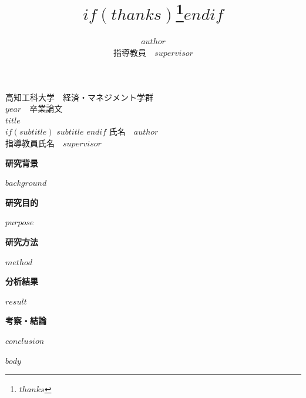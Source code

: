 \documentclass[lualatex,
               a4paper,
               10.5pt,
               ja=standard,
               jafont=ipaex]{bxjsarticle}
\title{\vspace{-28pt}{\Large\gtfamily\bfseries $title$}$if(thanks)$\thanks{$thanks$}$endif$}
\subtitle{\large\gtfamily\bfseries \vskip 0.4em $subtitle$\vspace{-8pt}}
\author{\large $author$\\ 指導教員　$supervisor$}
\date{} %
\begin{document}
\thispagestyle{empty}
\begin{center}
\Large
高知工科大学　経済・マネジメント学群 \\
$year$　卒業論文\\
\vspace{36truemm}
{\LARGE\gtfamily\bfseries $title$}\\
\vspace{4truemm}
$if(subtitle)$
  {\Large\gtfamily\bfseries $subtitle$}
$endif$
\vfill
氏名　$author$ \\
\vspace{8truemm}
指導教員氏名　$supervisor$
\end{center}

\newpage
\maketitle
\thispagestyle{empty} %

\noindent
\textbf{研究背景}

$background$

\vspace{4truemm}
\noindent
\textbf{研究目的}

$purpose$

\vspace{4truemm}
\noindent
\textbf{研究方法}

$method$

\vspace{4truemm}
\noindent
\textbf{分析結果}

$result$

\vspace{4truemm}
\noindent
\textbf{考察・結論}

$conclusion$

\newpage
{}

$body$



\end{document}

